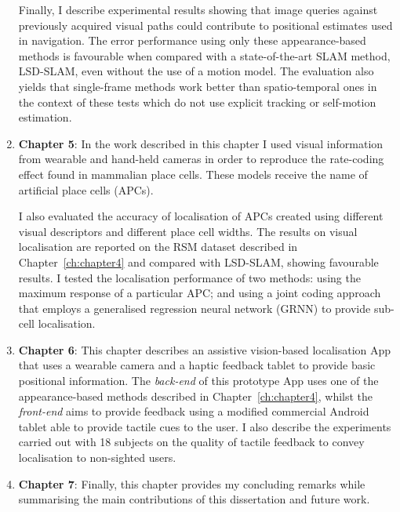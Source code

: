 \begin{enumerate}
Finally, I describe experimental results showing that image queries against previously acquired visual paths could contribute to positional estimates used in navigation. The error performance using only these appearance-based methods is favourable when compared with a state-of-the-art SLAM method, LSD-SLAM, even without the use of a motion model. The evaluation also yields that single-frame methods work better than spatio-temporal ones in the context of these tests which do not use explicit tracking or self-motion estimation. 

\item \textbf{Chapter 5}: In the work described in this chapter I used visual information from wearable and hand-held cameras in order to reproduce the rate-coding effect found in mammalian place cells. These models receive the name of artificial place cells (APCs). 

I also evaluated the accuracy of localisation of APCs created using different visual descriptors and different place cell widths. The results on visual localisation are reported on the RSM dataset described in Chapter~\ref{ch:chapter4} and compared with LSD-SLAM, showing favourable results. I tested the localisation performance of two methods: using the maximum response of a particular APC; and using a joint coding approach that employs a generalised regression neural network (GRNN) to provide sub-cell localisation.

\item \textbf{Chapter 6}: This chapter describes an assistive vision-based localisation App that uses a wearable camera and a haptic feedback tablet to provide basic positional information. The \textit{back-end} of this prototype App uses one of the appearance-based methods described in Chapter~\ref{ch:chapter4}, whilst the \textit{front-end} aims to provide feedback using a modified commercial Android tablet able to provide tactile cues to the user. I also describe the experiments carried out with 18 subjects on the quality of tactile feedback to convey localisation to non-sighted users.

\item \textbf{Chapter 7}: Finally, this chapter provides my concluding remarks while summarising the main contributions of this dissertation and future work.

\end{enumerate}
